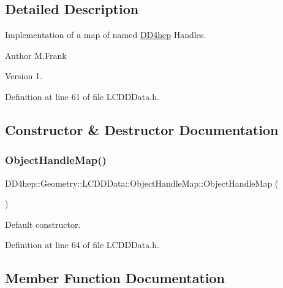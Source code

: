 \subsection{Detailed Description}
Implementation of a map of named \hyperlink{namespace_d_d4hep}{D\+D4hep} Handles. 

\begin{DoxyAuthor}{Author}
M.\+Frank 
\end{DoxyAuthor}
\begin{DoxyVersion}{Version}
1. 
\end{DoxyVersion}


Definition at line 61 of file L\+C\+D\+D\+Data.\+h.



\subsection{Constructor \& Destructor Documentation}
\hypertarget{class_d_d4hep_1_1_geometry_1_1_l_c_d_d_data_1_1_object_handle_map_aacc5d9dd1f2e355617b5a215c66f924b}{}\label{class_d_d4hep_1_1_geometry_1_1_l_c_d_d_data_1_1_object_handle_map_aacc5d9dd1f2e355617b5a215c66f924b} 
\subsubsection{\texorpdfstring{Object\+Handle\+Map()}{ObjectHandleMap()}}
{\footnotesize\ttfamily D\+D4hep\+::\+Geometry\+::\+L\+C\+D\+D\+Data\+::\+Object\+Handle\+Map\+::\+Object\+Handle\+Map (\begin{DoxyParamCaption}{ }\end{DoxyParamCaption})\hspace{0.3cm}{\ttfamily [inline]}}



Default constructor. 



Definition at line 64 of file L\+C\+D\+D\+Data.\+h.



\subsection{Member Function Documentation}
\hypertarget{class_d_d4hep_1_1_geometry_1_1_l_c_d_d_data_1_1_object_handle_map_a8881f90a02ef95a6a2e558f092e8f81a}{}\label{class_d_d4hep_1_1_geometry_1_1_l_c_d_d_data_1_1_object_handle_map_a8881f90a02ef95a6a2e558f092e8f81a} 
